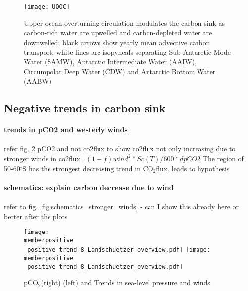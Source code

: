 \documentclass[12pt]{article}
\newcommand{\memberpositive}{m178_1985_1992} %
\begin{document}
\begin{figure}[h!]
\centering
\texttt{[image: UOOC]}
\vspace{-8mm}
\caption{Upper-ocean overturning circulation modulates the carbon sink as carbon-rich water are upwelled and carbon-depleted water are downwelled; black arrows show yearly mean advective carbon transport; white lines are isopyncals separating Sub-Antarctic Mode Water (SAMW), Antarctic Intermediate Water (AAIW), Circumpolar Deep Water (CDW) and Antarctic Bottom Water (AABW)}
	\label{fig:UOOC_mean}
\end{figure}










\clearpage

\subsection{Negative trends in carbon sink}


\paragraph{trends in pCO2 and westerly winds} refer fig. \ref{fig:pco2_neg} pCO2 and not co2flux to show co2flux not only increasing due to stronger winds in co2flux=$(1-f)wind^2*Sc(T)/600*dpCO2$  \citep{Wanninkhof1992}
 The region of 50-60$^\circ$S has the strongest decreasing trend in CO$_2$flux. leads to hypothesis
 
\paragraph{schematics: explain carbon decrease due to wind} refer to fig. \ref{fig:schematics_stronger_winds} - can I show this already here or better after the plots 



\begin{figure}[h!]
\centering
	\texttt{[image: \\memberpositive \_positive\_trend\_8\_Landschuetzer\_overview.pdf]}
	\texttt{[image: \\memberpositive \_positive\_trend\_8\_Landschuetzer\_overview.pdf]}	
	\caption{pCO$_2$(right) (left) and Trends in sea-level pressure and winds}
	\label{fig:pco2_neg}
\end{figure}
\end{document}
